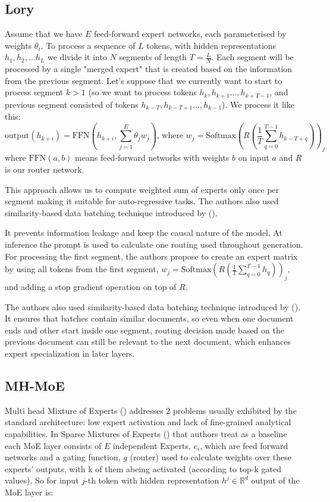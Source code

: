 \documentclass[12pt]{article}
\begin{document}
\subsection{Lory}
Assume that we have $E$ feed-forward expert networks, each parameterised by weights $\theta_i$. To process a sequence of $L$ tokens, with hidden representations $h_1, h_2, \dots h_L$ we divide it into $N$ segments of length $T = \frac{L}{N}$. Each segment will be processed by a single "merged expert" that is created based on the information from the previous segment. Let's suppose that we currently want to start to process segment $k>1$ (so we want to process tokens $h_k, h_{k+1}\dots ,h_{k+T -1}$, and previous segment consisted of tokens $h_{k - T}, h_{k-T+1}\dots ,h_{k-1}$). We process it like this:
\[\text{output}(h_{k + i}) = \text{FFN}(h_{k+i}, \sum_{j=1}^E \theta_j w_j) \text{,   where  } w_j = \text{Softmax}(R(\frac{1}{T}\sum_{q = 0}^{T-1}h_{k-T+q}))_j\] where $\text{FFN}(a, b)$ means feed-forward networks with weights $b$ on input $a$ and $R$ is our router network.

This approach allows us to compute weighted sum of experts only once per segment making it suitable for auto-regressive tasks. The authors also used similarity-based data batching technique introduced by (\cite{shi2023context}). 

%
It prevents information leakage and keep the causal nature of the model.
At inference the prompt is used to calculate one routing used throughout generation.
For processing the first segment, the authors propose to create an expert matrix by using all tokens from the first segment, $w_j = \text{Softmax}(R(\frac{1}{T}\sum_{q = 0}^{T-1}h_{q}))_j$, and adding a stop gradient operation on top of $R$.

The authors also used similarity-based data batching technique introduced by (\cite{shi2023context}). 
It ensures that batches contain similar documents, so even when one document ends and other start inside one segment, routing decision made based on the previous document can still be relevant to the next document, which enhances expert specialization in later layers.


\subsection{MH-MoE}
Multi head Mixture of Experts (\cite{wu2024multihead}) addresses 2 problems usually exhibited by the standard architecture:
low expert activation and lack of fine-grained analytical capabilities. 
In Sparse Mixtures of Experts (\cite{shazeer2017outrageously}) that authors treat as a baseline each MoE layer consists of $E$ independent Experts, $e_i$, which are feed forward networks and a gating function, $g$ (router) used to calculate weights over these experts' outputs, with k of them abeing activated (according to top-k gated values). So for input $j$-th token with hidden representation $h^j \in \mathbb{R}^d$ output of the MoE layer is:
\end{document}
